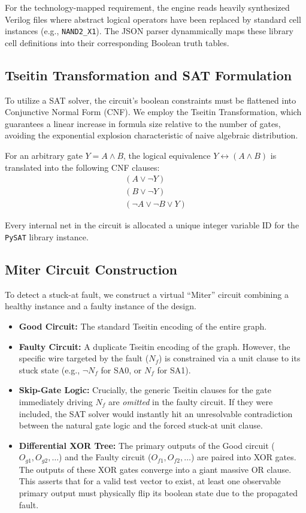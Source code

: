 \documentclass[11pt,a4paper]{article}
\begin{document}
For the technology-mapped requirement, the engine reads heavily synthesized Verilog files where abstract logical operators have been replaced by standard cell instances (e.g., \texttt{NAND2\_X1}). The JSON parser dynammically maps these library cell definitions into their corresponding Boolean truth tables.

\subsection{Tseitin Transformation and SAT Formulation}
To utilize a SAT solver, the circuit's boolean constraints must be flattened into Conjunctive Normal Form (CNF). We employ the Tseitin Transformation, which guarantees a linear increase in formula size relative to the number of gates, avoiding the exponential explosion characteristic of naive algebraic distribution.

For an arbitrary gate $Y = A \land B$, the logical equivalence $Y \leftrightarrow (A \land B)$ is translated into the following CNF clauses:
\begin{align}
    (A \lor \neg Y) \\
    (B \lor \neg Y) \\
    (\neg A \lor \neg B \lor Y)
\end{align}

Every internal net in the circuit is allocated a unique integer variable ID for the \texttt{PySAT} library instance.

\subsection{Miter Circuit Construction}
To detect a stuck-at fault, we construct a virtual ``Miter'' circuit combining a healthy instance and a faulty instance of the design.
\begin{itemize}
    \item \textbf{Good Circuit:} The standard Tseitin encoding of the entire graph.
    \item \textbf{Faulty Circuit:} A duplicate Tseitin encoding of the graph. However, the specific wire targeted by the fault ($N_f$) is constrained via a unit clause to its stuck state (e.g., $\neg N_f$ for SA0, or $N_f$ for SA1). 
    \item \textbf{Skip-Gate Logic:} Crucially, the generic Tseitin clauses for the gate immediately driving $N_f$ are \textit{omitted} in the faulty circuit. If they were included, the SAT solver would instantly hit an unresolvable contradiction between the natural gate logic and the forced stuck-at unit clause.
    \item \textbf{Differential XOR Tree:} The primary outputs of the Good circuit ($O_{g1}, O_{g2}, \dots$) and the Faulty circuit ($O_{f1}, O_{f2}, \dots$) are paired into XOR gates. The outputs of these XOR gates converge into a giant massive OR clause. This asserts that for a valid test vector to exist, at least one observable primary output must physically flip its boolean state due to the propagated fault.
\end{itemize}
\end{document}
